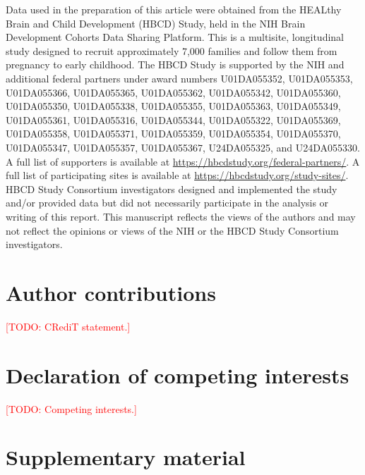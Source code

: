\documentclass[11pt]{article}
\newcommand{\todo}[1]{\textcolor{red}{[TODO: #1]}}
\begin{document}
Data used in the preparation of this article were obtained from the HEALthy Brain and Child Development (HBCD) Study,
held in the NIH Brain Development Cohorts Data Sharing Platform. This is a multisite, longitudinal study designed to
recruit approximately 7,000 families and follow them from pregnancy to early childhood. The HBCD Study is supported by
the NIH and additional federal partners under award numbers U01DA055352, U01DA055353, U01DA055366, U01DA055365,
U01DA055362, U01DA055342, U01DA055360, U01DA055350, U01DA055338, U01DA055355, U01DA055363, U01DA055349, U01DA055361,
U01DA055316, U01DA055344, U01DA055322, U01DA055369, U01DA055358, U01DA055371, U01DA055359, U01DA055354, U01DA055370,
U01DA055347, U01DA055357, U01DA055367, U24DA055325, and U24DA055330. A full list of supporters is available at
\url{https://hbcdstudy.org/federal-partners/}. A full list of participating sites is available at
\url{https://hbcdstudy.org/study-sites/}. HBCD Study Consortium investigators designed and implemented the study and/or
provided data but did not necessarily participate in the analysis or writing of this report. This manuscript reflects
the views of the authors and may not reflect the opinions or views of the NIH or the HBCD Study Consortium
investigators.

\section*{Author contributions}
\todo{CRediT statement.}

\section*{Declaration of competing interests}
\todo{Competing interests.}




\clearpage
\appendix
\section{Supplementary material}
\setcounter{figure}{0}
\setcounter{table}{0}
\end{document}
